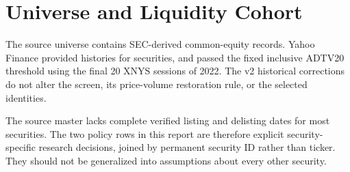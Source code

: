 \section{Universe and Liquidity Cohort}

The source universe contains \UniverseSecurities{} SEC-derived common-equity
records. Yahoo Finance provided histories for \AcquiredSecurities{} securities,
and \SelectedSecurities{} passed the fixed inclusive ADTV20 threshold using the
final 20 XNYS sessions of 2022. The v2 historical corrections do not alter the
screen, its price-volume restoration rule, or the selected identities.

The source master lacks complete verified listing and delisting dates for most
securities. The two policy rows in this report are therefore explicit
security-specific research decisions, joined by permanent security ID rather
than ticker. They should not be generalized into assumptions about every other
security.
